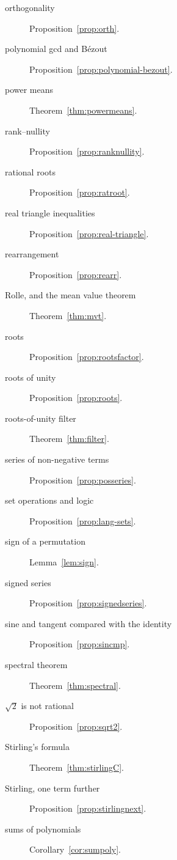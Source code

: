 \begin{description}
\item[orthogonality] Proposition~\ref{prop:orth}.
\item[polynomial gcd and B\'ezout] Proposition~\ref{prop:polynomial-bezout}.
\item[power means] Theorem~\ref{thm:powermeans}.
\item[rank--nullity] Proposition~\ref{prop:ranknullity}.
\item[rational roots] Proposition~\ref{prop:ratroot}.
\item[real triangle inequalities] Proposition~\ref{prop:real-triangle}.
\item[rearrangement] Proposition~\ref{prop:rearr}.
\item[Rolle, and the mean value theorem] Theorem~\ref{thm:mvt}.
\item[roots] Proposition~\ref{prop:rootsfactor}.
\item[roots of unity] Proposition~\ref{prop:roots}.
\item[roots-of-unity filter] Theorem~\ref{thm:filter}.
\item[series of non-negative terms] Proposition~\ref{prop:posseries}.
\item[set operations and logic] Proposition~\ref{prop:lang-sets}.
\item[sign of a permutation] Lemma~\ref{lem:sign}.
\item[signed series] Proposition~\ref{prop:signedseries}.
\item[sine and tangent compared with the identity] Proposition~\ref{prop:sincmp}.
\item[spectral theorem] Theorem~\ref{thm:spectral}.
\item[$\sqrt2$ is not rational] Proposition~\ref{prop:sqrt2}.
\item[Stirling's formula] Theorem~\ref{thm:stirlingC}.
\item[Stirling, one term further] Proposition~\ref{prop:stirlingnext}.
\item[sums of polynomials] Corollary~\ref{cor:sumpoly}.

\end{description}
